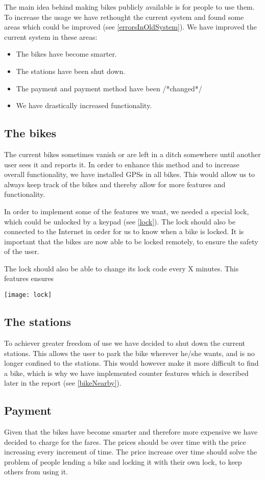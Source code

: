 The main idea behind making bikes publicly available is for people to use them. To increase the usage we have rethought the current system and found some areas which could be improved (see \ref{errorsInOldSystem}).
We have improved the current system in these areas:
\begin{itemize}
\item The bikes have become smarter.
\item The stations have been shut down.
\item The payment and payment method have been /*changed*/
\item We have drastically increased functionality.
\end{itemize}

\subsection{The bikes}
The current bikes sometimes vanish or are left in a ditch somewhere until another user sees it and reports it. In order to enhance this method and to increase overall functionality, we have installed GPSs in all bikes. This would allow us to always keep track of the bikes and thereby allow for more features and functionality.

In order to implement some of the features we want, we needed a special lock, which could be unlocked by a keypad (see \ref{lock}). The lock should also be connected to the Internet in order for us to know when a bike is locked. It is important that the bikes are now able to be locked remotely, to ensure the safety of the user.

The lock should also be able to change its lock code every X minutes. This features ensures 

\texttt{[image: lock]}

\subsection{The stations}
To achiever greater freedom of use we have decided to shut down the current stations. This allows the user to park the bike wherever he/she wants, and is no longer confined to the stations. This would however make it more difficult to find a bike, which is why we have implemented counter features which is described later in the report (see \ref{bikeNearby}).

\subsection{Payment}
Given that the bikes have become smarter and therefore more expensive we have decided to charge for the fares. The prices should be over time with the price increasing every increment of time.
The price increase over time should solve the problem of people lending a bike and locking it with their own lock, to keep others from using it. 

